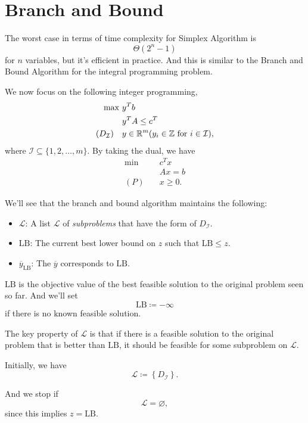 \section{Branch and Bound}
\begin{prev}
	The worst case in terms of time complexity for Simplex Algorithm is
	\[
		\Theta(2^n - 1)
	\]
	for \(n\) variables, but it's efficient in practice. And this is similar to
	the Branch and Bound Algorithm for the integral programming problem.
\end{prev}

We now focus on the following integer programming,
\begin{align*}
	\max~                   & y^{T}b                                                                                              \\
	                        & y^{T}A\leq c^{T}                                                                                    \\
	(D_{\mathcal{I} })\quad & y\in\mathbb{\MakeUppercase{R}}^m(y_{i}\in\mathbb{\MakeUppercase{Z}} \text{ for } i\in \mathcal{I}),
\end{align*}
where \(\mathcal{I} \subseteq \{1, 2, \ldots , m\}\). By taking the dual, we have
\begin{align*}
	\min~    & c^Tx     \\
	         & Ax = b   \\
	(P)\quad & x\geq 0.
\end{align*}

We'll see that the branch and bound algorithm maintains the following:
\begin{itemize}
	\item \(\mathcal{L} \): A list \(\mathcal{L} \) of \emph{subproblems} that have the form of \(D_{\mathcal{I} }\).
	\item \(\mathrm{LB} \): The current best lower bound on \(z\) such that \(\mathrm{LB}\leq z \).
	\item \(\overline{y}_{\mathrm{LB}}\): The \(\overline{y}\) corresponds to \(\mathrm{LB}\).
\end{itemize}

\begin{note}
	\(\mathrm{LB} \) is the objective value of the best feasible solution to the original problem seen so far. And we'll set
	\[
		\mathrm{LB} \coloneqq  -\infty
	\]
	if there is no known feasible solution.
\end{note}
\begin{remark}
	The key property of \(\mathcal{L} \) is that if there is a feasible solution to the original problem that is better than
	\(\mathrm{LB} \), it should be feasible for some subproblem on \(\mathcal{L} \).

	\par Initially, we have
	\[
		\mathcal{L} \coloneqq \left\{D_{\mathcal{I}}\right\}.
	\]

	\par And we stop if
	\[
		\mathcal{L} = \varnothing,
	\]
	since this implies \(z = \mathrm{LB} \).
\end{remark}

